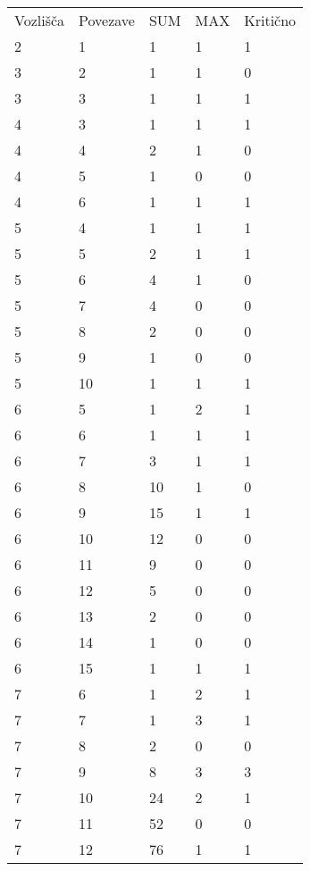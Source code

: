 \documentclass[fin1, tisk]{fmfdelo}
\begin{document}
\scriptsize
\begin{tabular}{lllll}
    Vozlišča & Povezave & SUM & MAX & Kritično \\ 
    2 & 1 & 1 & 1 & 1 \\ 
    3 & 2 & 1 & 1 & 0 \\ 
    3 & 3 & 1 & 1 & 1 \\ 
    4 & 3 & 1 & 1 & 1 \\ 
    4 & 4 & 2 & 1 & 0 \\ 
    4 & 5 & 1 & 0 & 0 \\ 
    4 & 6 & 1 & 1 & 1 \\ 
    5 & 4 & 1 & 1 & 1 \\ 
    5 & 5 & 2 & 1 & 1 \\ 
    5 & 6 & 4 & 1 & 0 \\ 
    5 & 7 & 4 & 0 & 0 \\ 
    5 & 8 & 2 & 0 & 0 \\ 
    5 & 9 & 1 & 0 & 0 \\ 
    5 & 10 & 1 & 1 & 1 \\ 
    6 & 5 & 1 & 2 & 1 \\ 
    6 & 6 & 1 & 1 & 1 \\ 
    6 & 7 & 3 & 1 & 1 \\ 
    6 & 8 & 10 & 1 & 0 \\ 
    6 & 9 & 15 & 1 & 1 \\ 
    6 & 10 & 12 & 0 & 0 \\ 
    6 & 11 & 9 & 0 & 0 \\ 
    6 & 12 & 5 & 0 & 0 \\ 
    6 & 13 & 2 & 0 & 0 \\ 
    6 & 14 & 1 & 0 & 0 \\ 
    6 & 15 & 1 & 1 & 1 \\ 
    7 & 6 & 1 & 2 & 1 \\ 
    7 & 7 & 1 & 3 & 1 \\ 
    7 & 8 & 2 & 0 & 0 \\ 
    7 & 9 & 8 & 3 & 3 \\ 
    7 & 10 & 24 & 2 & 1 \\ 
    7 & 11 & 52 & 0 & 0 \\ 
    7 & 12 & 76 & 1 & 1 \\ 
\end{tabular}
\scriptsize
\end{document}

